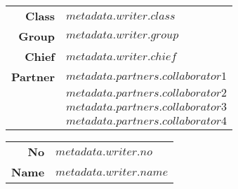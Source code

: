 \documentclass[9pt,a4paper,$if(lang)$$babel-lang$,$endif$]{ltjsarticle}
\begin{document}
\vspace{10mm}

\begin{table}[!h]
  \begin{flushright}
    \begin{tabular}{rl}
      \textbf{Class}   & \textbf{ $metadata.writer.class$ } \\
      \textbf{Group}   & \textbf{ $metadata.writer.group$ } \\
      \textbf{Chief}   & \textbf{ $metadata.writer.chief$ } \\
      \textbf{Partner} & \textbf{ $metadata.partners.collaborator1$ } \\
                       & \textbf{ $metadata.partners.collaborator2$ } \\
                       & \textbf{ $metadata.partners.collaborator3$ } \\
                       & \textbf{ $metadata.partners.collaborator4$ }
    \end{tabular}
  \end{flushright}
\end{table}

\vspace{15mm}

\begin{table}[!h]
  \begin{flushright}
    \begin{tabular}{rl}
      \textbf{No}   & \textbf{ $metadata.writer.no$ } \\
      \textbf{Name} & \textbf{ $metadata.writer.name$ }
    \end{tabular}
  \end{flushright}
\end{table}



\end{document}
